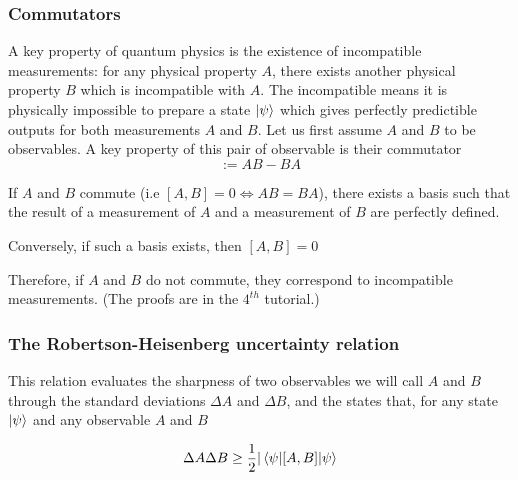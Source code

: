 \documentclass{article}
\begin{document}
\subsubsection{Commutators}
A key property of quantum physics is the existence of incompatible measurements:
for any physical property $A$, there exists another physical property $B$ which is incompatible
with $A$. The incompatible means it is physically impossible to prepare a state $\ket{\psi}$
which gives perfectly predictible outputs for both measurements $A$ and $B$.
Let us first assume $A$ and $B$ to be observables.
A key property of this pair of observable is their commutator
\begin{equation}
    [A,B]:= AB-BA
\end{equation}

If $A$ and $B$ commute (i.e $[A,B]=0 \Leftrightarrow AB = BA$), there exists a basis
such that the result of a measurement of $A$ and a measurement of $B$ are perfectly defined.

Conversely, if such a basis exists, then $[A,B]=0$

Therefore, if $A$ and $B$ do not commute, they correspond to incompatible measurements.
(The proofs are in the $4^{th}$ tutorial.)

\subsubsection{The Robertson-Heisenberg uncertainty relation}
This relation evaluates the sharpness of two observables we will call $A$ and $B$ through
the standard deviations $\Delta A$ and $\Delta B$, and the states that, for any state $\ket{\psi}$
and any observable $A$ and $B$

\begin{equation}
    \Delta A \Delta B \geq \frac{1}{2}|\braket{\psi|[A,B]|\psi}
\end{equation}
\end{document}
